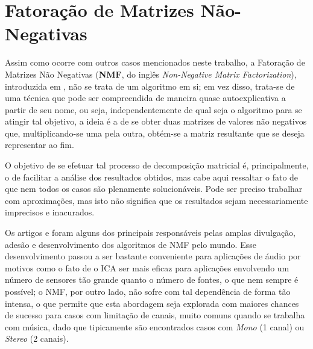 \section{Fatoração de Matrizes Não-Negativas}
\label{sec:bss_nmf}

Assim como ocorre com outros casos mencionados neste trabalho, a Fatoração de Matrizes Não Negativas (\textbf{NMF}, do inglês \textit{Non-Negative Matrix Factorization}), introduzida em \citep{1781640}, não se trata de um algoritmo em si; em vez disso, trata-se de uma técnica que pode ser compreendida de maneira quase autoexplicativa a partir de seu nome, ou seja, independentemente de qual seja o algoritmo para se atingir tal objetivo, a ideia é a de se obter duas matrizes de valores não negativos que, multiplicando-se uma pela outra, obtém-se a matriz resultante que se deseja representar ao fim.


O objetivo de se efetuar tal processo de decomposição matricial é, principalmente, o de facilitar a análise dos resultados obtidos, mas cabe aqui ressaltar o fato de que nem todos os casos são plenamente solucionáveis. Pode ser preciso trabalhar com aproximações, mas isto não significa que os resultados sejam necessariamente imprecisos e inacurados.

Os artigos \citep{lee1999learning} e \citep{Lee:2000:ANM:3008751.3008829} foram alguns dos principais responsáveis pelas amplas divulgação, adesão e desenvolvimento dos algoritmos de NMF pelo mundo. Esse desenvolvimento passou a ser bastante conveniente para aplicações de áudio por motivos como o fato de o ICA ser mais eficaz para aplicações envolvendo um número de sensores tão grande quanto o número de fontes, o que nem sempre é possível; o NMF, por outro lado, não sofre com tal dependência de forma tão intensa, o que permite que esta abordagem seja explorada com maiores chances de sucesso para casos com limitação de canais, muito comuns quando se trabalha com música, dado que tipicamente são encontrados casos com \textit{Mono} (1 canal) ou \textit{Stereo} (2 canais).
